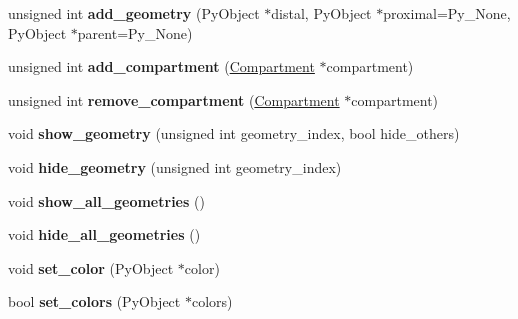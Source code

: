 \begin{DoxyCompactItemize}
\item 
\hypertarget{classNeuron_a878d0f990eb4aa2fd2827f228e7e1f74}{unsigned int {\bfseries add\-\_\-geometry} (Py\-Object $\ast$distal, Py\-Object $\ast$proximal=Py\-\_\-\-None, Py\-Object $\ast$parent=Py\-\_\-\-None)}\label{classNeuron_a878d0f990eb4aa2fd2827f228e7e1f74}

\item 
\hypertarget{classNeuron_a32adf0e61082065658c9d247b02b5e3b}{unsigned int {\bfseries add\-\_\-compartment} (\hyperlink{classCompartment}{Compartment} $\ast$compartment)}\label{classNeuron_a32adf0e61082065658c9d247b02b5e3b}

\item 
\hypertarget{classNeuron_ab46566c6c4b49375811d50502c716329}{unsigned int {\bfseries remove\-\_\-compartment} (\hyperlink{classCompartment}{Compartment} $\ast$compartment)}\label{classNeuron_ab46566c6c4b49375811d50502c716329}

\item 
\hypertarget{classNeuron_ab8784f82a6467442f2ddbb921e612ff2}{void {\bfseries show\-\_\-geometry} (unsigned int geometry\-\_\-index, bool hide\-\_\-others)}\label{classNeuron_ab8784f82a6467442f2ddbb921e612ff2}

\item 
\hypertarget{classNeuron_a623aa995b8b4f957272c6932e3986c09}{void {\bfseries hide\-\_\-geometry} (unsigned int geometry\-\_\-index)}\label{classNeuron_a623aa995b8b4f957272c6932e3986c09}

\item 
\hypertarget{classNeuron_a82af601b43aee10e772081d40481e90a}{void {\bfseries show\-\_\-all\-\_\-geometries} ()}\label{classNeuron_a82af601b43aee10e772081d40481e90a}

\item 
\hypertarget{classNeuron_a59ec3cae0be2e818de48494f14900e8b}{void {\bfseries hide\-\_\-all\-\_\-geometries} ()}\label{classNeuron_a59ec3cae0be2e818de48494f14900e8b}

\item 
\hypertarget{classNeuron_a1062ac27f56bf9212b2f2e7a0a9c7fcf}{void {\bfseries set\-\_\-color} (Py\-Object $\ast$color)}\label{classNeuron_a1062ac27f56bf9212b2f2e7a0a9c7fcf}

\item 
\hypertarget{classNeuron_ae4e41149b9251116a407227388640552}{bool {\bfseries set\-\_\-colors} (Py\-Object $\ast$colors)}\label{classNeuron_ae4e41149b9251116a407227388640552}

\end{DoxyCompactItemize}
